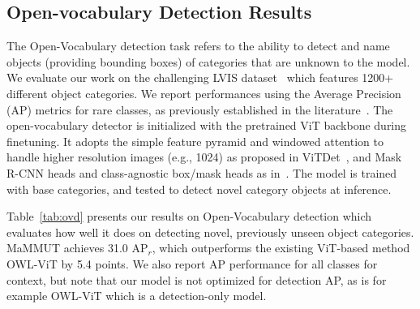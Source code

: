 \documentclass[10pt]{article} \usepackage[accepted]{tmlr}
\newcommand{\ours}{MaMMUT\xspace}
\begin{document}
\subsection{Open-vocabulary Detection Results}
\label{sec:detection}

The Open-Vocabulary detection task refers to the ability to detect and name objects (providing bounding boxes) of categories that are unknown to the model. We evaluate our work on the challenging LVIS dataset~\citep{lvis} which features 1200+ different object categories. We report performances using the Average Precision (AP) metrics for rare classes, as previously established in the literature~\citep{gu2022openvocabulary,minderer2022simple}. 
The open-vocabulary detector is initialized with the pretrained ViT backbone during finetuning. It adopts the simple feature pyramid and windowed attention to handle higher resolution images (e.g., 1024) as proposed in ViTDet~\citep{li2022exploring}, and Mask R-CNN heads and class-agnostic box/mask heads as in~\citep{du2022learning,gu2022openvocabulary,Zareian_2021_CVPR,zhong2021regionclip}. The model is trained with base categories, and tested to detect novel category objects at inference.

Table~\ref{tab:ovd} presents our results on Open-Vocabulary detection which evaluates how well it does on detecting novel, previously unseen object categories. \ours achieves 31.0 AP$_r$, which outperforms the existing ViT-based method OWL-ViT by 5.4 points. We also report AP performance for all classes for context, but note that our model is not optimized for detection AP, as is for example OWL-ViT which is a detection-only model.
\end{document}
